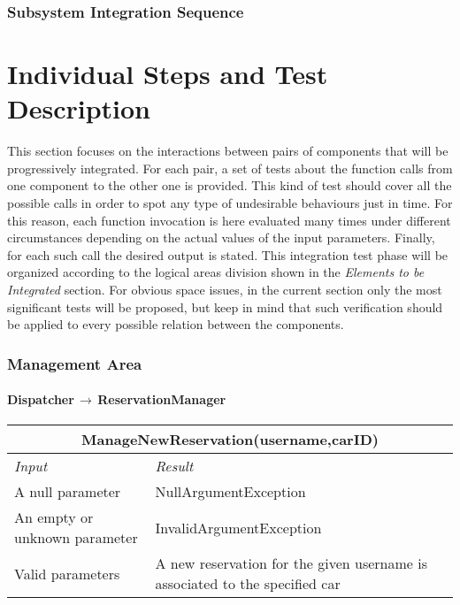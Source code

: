 \documentclass[11pt,a4paper]{report}
\begin{document}
\subsection{Subsystem Integration Sequence}
\chapter{Individual Steps and Test Description}
This section focuses on the interactions between pairs of components that will be progressively integrated. For each pair, a set of tests about the  function calls from one component to the other one is provided. This kind of test should cover all the possible calls in order to spot any type of undesirable behaviours just in time. For this reason, each function invocation is here evaluated many times under different circumstances depending on the actual values of the input parameters. Finally, for each such call the desired output is stated.
This integration test phase will be organized according to the logical areas division shown in the \textit{Elements to be Integrated} section.
For obvious space issues, in the current section only the most significant tests will be proposed, but keep in mind that such verification should be applied to every possible relation between the components.
\subsection{Management Area}
\subsubsection{Dispatcher$\,\to\,$ReservationManager}
\begin{tabularx}{\textwidth}{|X|X|}
	\hline
	\multicolumn{2}{|c|}{\textbf{ManageNewReservation(username,carID)}}\\
	\hline
	\textit{Input} & \textit{Result}\\
	\hline
	A null parameter & NullArgumentException\\
	\hline
	An empty or unknown parameter & InvalidArgumentException\\
	\hline
	Valid parameters & A new reservation for the given username is associated to the specified car\\
	\hline
\end{tabularx}
\end{document}
